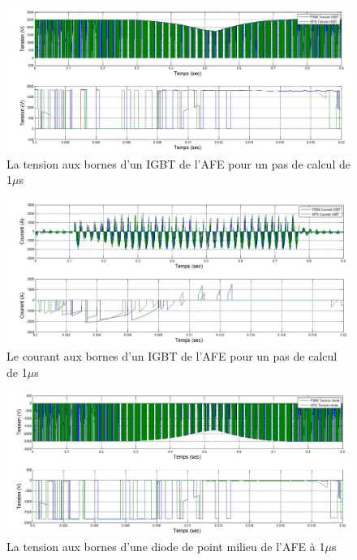 \begin{figure}[htb]
\centering
\includegraphics[scale=0.5]{fig/DCP_AFE/1u/IGBT_afe.jpg}
\caption{La tension aux bornes d'un IGBT de l'AFE pour un pas de calcul de 1$\mu$s}
\label{AF_DC_IGBT1}
\end{figure}


\begin{figure}[htb]
\centering
\includegraphics[scale=0.5]{fig/DCP_AFE/1u/cou_IGBT_afe.jpg}
\caption{Le courant aux bornes d'un IGBT de l'AFE pour un pas de calcul de 1$\mu$s}
\label{AF_DC_IGBT2}
\end{figure}


\begin{figure}[htb]
\centering
\includegraphics[scale=0.5]{fig/DCP_AFE/1u/ten_diode_afe.jpg}
\caption{La tension aux bornes d'une diode de point milieu de l'AFE à 1$\mu$s}
\label{AF_DC_DI1}
\end{figure}


